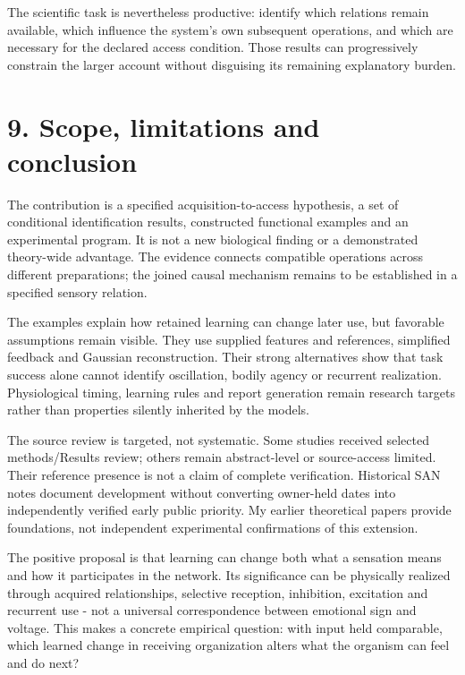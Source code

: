 \documentclass[
  american,
  11pt,
  letterpaper,
]{article}
\begin{document}
The scientific task is nevertheless productive: identify which relations remain available, which influence the system's own subsequent operations, and which are necessary for the declared access condition. Those results can progressively constrain the larger account without disguising its remaining explanatory burden.

\section{9. Scope, limitations and conclusion}\label{scope-limitations-and-conclusion}

The contribution is a specified acquisition-to-access hypothesis, a set of conditional identification results, constructed functional examples and an experimental program. It is not a new biological finding or a demonstrated theory-wide advantage. The evidence connects compatible operations across different preparations; the joined causal mechanism remains to be established in a specified sensory relation.

The examples explain how retained learning can change later use, but favorable assumptions remain visible. They use supplied features and references, simplified feedback and Gaussian reconstruction. Their strong alternatives show that task success alone cannot identify oscillation, bodily agency or recurrent realization. Physiological timing, learning rules and report generation remain research targets rather than properties silently inherited by the models.

The source review is targeted, not systematic. Some studies received selected methods/Results review; others remain abstract-level or source-access limited. Their reference presence is not a claim of complete verification. Historical SAN notes document development without converting owner-held dates into independently verified early public priority. My earlier theoretical papers provide foundations, not independent experimental confirmations of this extension.

The positive proposal is that learning can change both what a sensation means and how it participates in the network. Its significance can be physically realized through acquired relationships, selective reception, inhibition, excitation and recurrent use - not a universal correspondence between emotional sign and voltage. This makes a concrete empirical question: with input held comparable, which learned change in receiving organization alters what the organism can feel and do next?
\end{document}
